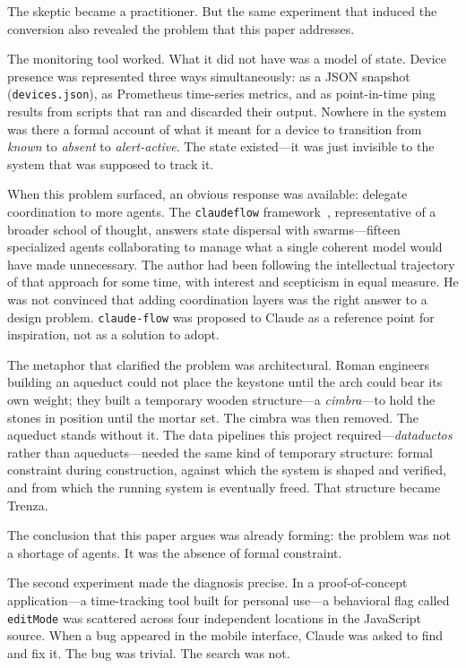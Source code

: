 The skeptic became a practitioner. But the same experiment that induced the
conversion also revealed the problem that this paper addresses.

The monitoring tool worked. What it did not have was a model of state. Device
presence was represented three ways simultaneously: as a JSON snapshot
(\texttt{devices.json}), as Prometheus time-series metrics, and as
point-in-time ping results from scripts that ran and discarded their output.
Nowhere in the system was there a formal account of what it meant for a device
to transition from \emph{known} to \emph{absent} to \emph{alert-active}. The
state existed---it was just invisible to the system that was supposed to track
it.

When this problem surfaced, an obvious response was available: delegate
coordination to more agents. The \texttt{claude\-flow}
framework~\cite{claudeflow2024}, representative of a broader school of thought,
answers state dispersal with swarms---fifteen specialized agents collaborating
to manage what a single coherent model would have made unnecessary. The author
had been following the intellectual trajectory of that approach for some time,
with interest and scepticism in equal measure. He was not convinced that adding
coordination layers was the right answer to a design problem.
\texttt{claude-flow} was proposed to Claude as a reference point for
inspiration, not as a solution to adopt.

The metaphor that clarified the problem was architectural. Roman engineers
building an aqueduct could not place the keystone until the arch could bear its
own weight; they built a temporary wooden structure---a \emph{cimbra}---to hold
the stones in position until the mortar set. The cimbra was then removed. The
aqueduct stands without it. The data pipelines this project required---\emph{dataductos}
rather than aqueducts---needed the same kind of temporary structure: formal
constraint during construction, against which the system is shaped and verified,
and from which the running system is eventually freed. That structure became
Trenza.

The conclusion that this paper argues was already forming: the problem was not
a shortage of agents. It was the absence of formal constraint.

The second experiment made the diagnosis precise. In a proof-of-concept
application---a time-tracking tool built for personal use---a behavioral flag
called \texttt{editMode} was scattered across four independent locations in
the JavaScript source. When a bug appeared in the mobile interface, Claude was
asked to find and fix it. The bug was trivial. The search was not.

